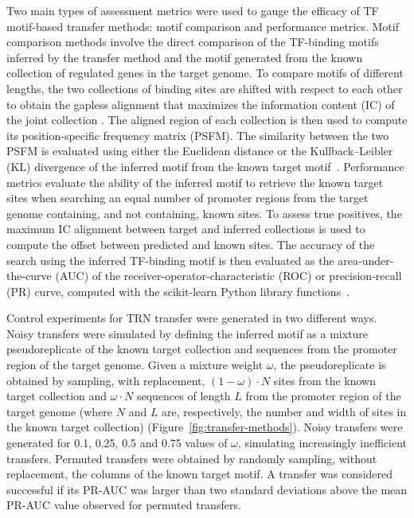 Two main types of assessment metrics were used to gauge the efficacy of TF
motif-based transfer methods: motif comparison and performance metrics. Motif
comparison methods involve the direct comparison of the TF-binding motifs
inferred by the transfer method and the motif generated from the known
collection of regulated genes in the target genome. To compare motifs of
different lengths, the two collections of binding sites are shifted with
respect to each other to obtain the gapless alignment that maximizes the
information content (IC) of the joint collection
\citep{schneider1986information}. The aligned region of each collection is then
used to compute its position-specific frequency matrix (PSFM). The similarity
between the two PSFM is evaluated using either the Euclidean distance or the
Kullback–Leibler (KL) divergence of the inferred motif from the known target
motif~\citep{gupta2007quantifying}. Performance metrics evaluate the ability of
the inferred motif to retrieve the known target sites when searching an equal
number of promoter regions from the target genome containing, and not
containing, known sites. To assess true positives, the maximum IC alignment
between target and inferred collections is used to compute the offset between
predicted and known sites. The accuracy of the search using the inferred
TF-binding motif is then evaluated as the area-under-the-curve (AUC) of the
receiver-operator-characteristic (ROC) or precision-recall (PR) curve, computed
with the scikit-learn Python library functions~\citep{lewis1991evaluating,
  zweig1993receiver, scikit-learn}.

Control experiments for TRN transfer were generated in two different
ways. Noisy transfers were simulated by defining the inferred motif as a
mixture pseudoreplicate of the known target collection and sequences from the
promoter region of the target genome. Given a mixture weight $\omega$, the
pseudoreplicate is obtained by sampling, with replacement, $(1-\omega) \cdot N$
sites from the known target collection and $\omega \cdot N$ sequences of length
$L$ from the promoter region of the target genome (where $N$ and $L$ are,
respectively, the number and width of sites in the known target collection)
(Figure~\ref{fig:transfer-methods}). Noisy transfers were generated for 0.1,
0.25, 0.5 and 0.75 values of $\omega$, simulating increasingly inefficient
transfers. Permuted transfers were obtained by randomly sampling, without
replacement, the columns of the known target motif. A transfer was considered
successful if its PR-AUC was larger than two standard deviations above the mean
PR-AUC value observed for permuted transfers.
